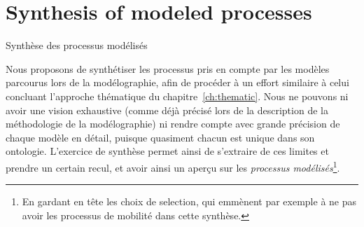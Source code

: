 


\newpage

\section*{Synthesis of modeled processes}{Synthèse des processus modélisés}



Nous proposons de synthétiser les processus pris en compte par les modèles parcourus lors de la modélographie, afin de procéder à un effort similaire à celui concluant l'approche thématique du chapitre~\ref{ch:thematic}. Nous ne pouvons ni avoir une vision exhaustive (comme déjà précisé lors de la description de la méthodologie de la modélographie) ni rendre compte avec grande précision de chaque modèle en détail, puisque quasiment chacun est unique dans son ontologie. L'exercice de synthèse permet ainsi de s'extraire de ces limites et prendre un certain recul, et avoir ainsi un aperçu sur les \emph{processus modélisés}\footnote{En gardant en tête les choix de selection, qui emmènent par exemple à ne pas avoir les processus de mobilité dans cette synthèse.}.



